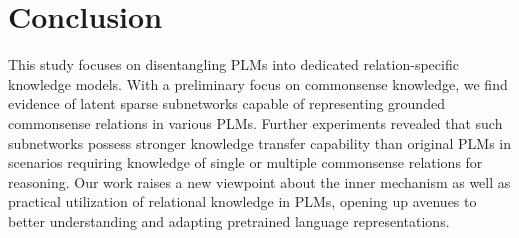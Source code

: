 \section{Conclusion}
This study focuses on disentangling PLMs into dedicated relation-specific knowledge models. With a preliminary focus on  
commonsense knowledge, we find evidence of latent sparse subnetworks 
capable of representing grounded commonsense relations in various PLMs. Further experiments revealed 
that such subnetworks possess stronger knowledge transfer capability than original PLMs in scenarios requiring knowledge of single or multiple commonsense relations for reasoning. Our work raises a new viewpoint 
about the inner mechanism as well as practical utilization of relational knowledge in PLMs, opening up avenues to better understanding and adapting pretrained language representations.
%
%




